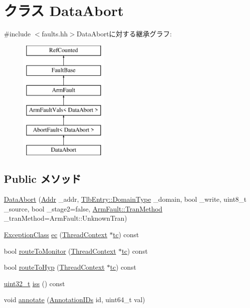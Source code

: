 \hypertarget{classArmISA_1_1DataAbort}{
\section{クラス DataAbort}
\label{classArmISA_1_1DataAbort}
}


{\ttfamily \#include $<$faults.hh$>$}DataAbortに対する継承グラフ:\begin{figure}[H]
\begin{center}
\leavevmode
\includegraphics[height=6cm]{classArmISA_1_1DataAbort}
\end{center}
\end{figure}
\subsection*{Public メソッド}
\begin{DoxyCompactItemize}
\item 
\hyperlink{classArmISA_1_1DataAbort_aca4861c0042d8fa8b6d71b89d1ebe0e6}{DataAbort} (\hyperlink{classm5_1_1params_1_1Addr}{Addr} \_\-addr, \hyperlink{structArmISA_1_1TlbEntry_a0595b41cfb7d03f18438f9c355a3469d}{TlbEntry::DomainType} \_\-domain, bool \_\-write, uint8\_\-t \_\-source, bool \_\-stage2=false, \hyperlink{classArmISA_1_1ArmFault_ad78237d6390becbe8bdf9e73979c56ae}{ArmFault::TranMethod} \_\-tranMethod=ArmFault::UnknownTran)
\item 
\hyperlink{namespaceArmISA_a04034d12009cf36227f4d2abff3331a2}{ExceptionClass} \hyperlink{classArmISA_1_1DataAbort_aefab73b22a74d7c48b8a23230906d7cd}{ec} (\hyperlink{classThreadContext}{ThreadContext} $\ast$\hyperlink{namespaceArmISA_a5aff829af55e65b802d83dfcef4e9dd0}{tc}) const 
\item 
bool \hyperlink{classArmISA_1_1DataAbort_afd7a21fdb010230ad53094254739dde8}{routeToMonitor} (\hyperlink{classThreadContext}{ThreadContext} $\ast$\hyperlink{namespaceArmISA_a5aff829af55e65b802d83dfcef4e9dd0}{tc}) const 
\item 
bool \hyperlink{classArmISA_1_1DataAbort_a16facd13ba8e6d15d2b865882c379d5f}{routeToHyp} (\hyperlink{classThreadContext}{ThreadContext} $\ast$\hyperlink{namespaceArmISA_a5aff829af55e65b802d83dfcef4e9dd0}{tc}) const 
\item 
\hyperlink{Type_8hh_a435d1572bf3f880d55459d9805097f62}{uint32\_\-t} \hyperlink{classArmISA_1_1DataAbort_a54f4d33ac162a95fd5b3830cf7fab8ff}{iss} () const 
\item 
void \hyperlink{classArmISA_1_1DataAbort_a284956f8d8ec0f18434d857ae44c6a6c}{annotate} (\hyperlink{classArmISA_1_1ArmFault_a955305710181a260a9ee0b419a6027fb}{AnnotationIDs} id, uint64\_\-t val)
\end{DoxyCompactItemize}
